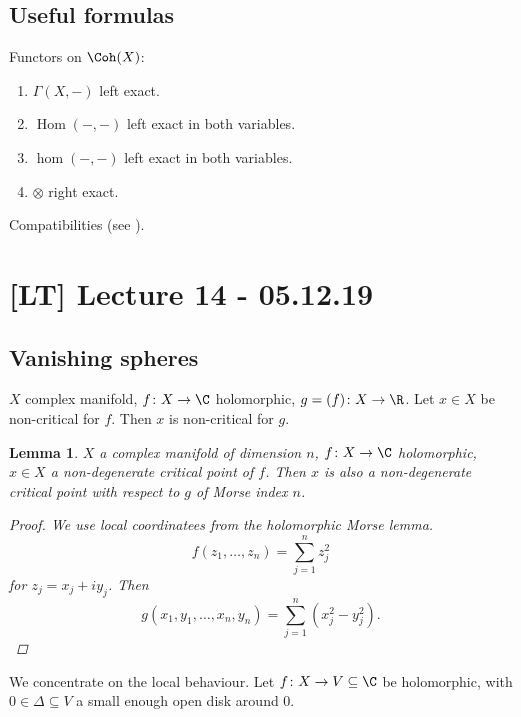 \documentclass[A4paper, british]{amsart}
\theoremstyle{darkgreentheorem}
\newtheorem{lm}[thm]{Lemma}
\theoremstyle{darkbluedefinition}
\theoremstyle{darkredexample}
\theoremstyle{remark}
\DeclareMathOperator{\Hom}{Hom}
\let\Re\relax
\DeclareMathOperator{\Re}{Re}
\newcommand{\1}{\mathbbm{1}}
\newcommand{\ot}{\otimes}
\newcommand{\sub}{\subseteq}
\begin{document}
\subsection{Useful formulas}

Functors on $\Coh(X)$:
\begin{enumerate}
    \item $\Gamma(X,-)$ left exact.
    \item $\Hom(-,-)$ left exact in both variables.
    \item $\hom(-,-)$ left exact in both variables.
    \item $\ot $ right exact.
\end{enumerate}

Compatibilities (see \cite[Chapter 3]{huy06}).

\section{[LT] Lecture 14 - 05.12.19}

\subsection{Vanishing spheres}

$X$ complex manifold, $f\colon X\to \C$ holomorphic, $g=\Re(f)\colon X\to \R$.
Let $x\in X$ be non-critical for $f$.
Then $x$ is non-critical for $g$.

\begin{lm}
    $X$ a complex manifold of dimension $n$, $f\colon X\to \C$ holomorphic, $x\in X$ a non-degenerate critical point of $f$.
    Then $x$ is also a non-degenerate critical point with respect to $g$ of Morse index $n$.
    \begin{proof}
	We use local coordinatees from the holomorphic Morse lemma.
	\[ f(z_{1},\ldots,z_{n})=\sum_{j=1}^{n}z_{j}^{2} \]
	for $z_{j}=x_{j}+iy_{j}$.
	Then
	\[ g(x_{1},y_{1},\ldots,x_{n},y_{n})=\sum_{j=1}^{n}(x_{j}^{2}-y_{j}^{2}).\]
    \end{proof}
\end{lm}

We concentrate on the local behaviour.
Let $f\colon X\to V\sub \C$ be holomorphic, with $0\in \Delta\sub V$ a small enough open disk around $0$.
\end{document}
